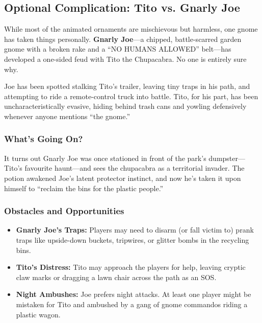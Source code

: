 \begin{multicols}{2}

\subsection{Optional Complication: Tito vs. Gnarly Joe}

While most of the animated ornaments are mischievous but harmless, one gnome has taken things personally. \textbf{Gnarly Joe}—a chipped, battle-scarred garden gnome with a broken rake and a “NO HUMANS ALLOWED” belt—has developed a one-sided feud with Tito the Chupacabra. No one is entirely sure why.

Joe has been spotted stalking Tito’s trailer, leaving tiny traps in his path, and attempting to ride a remote-control truck into battle. Tito, for his part, has been uncharacteristically evasive, hiding behind trash cans and yowling defensively whenever anyone mentions “the gnome.”

\subsubsection{What’s Going On?}
It turns out Gnarly Joe was once stationed in front of the park’s dumpster—Tito’s favourite haunt—and sees the chupacabra as a territorial invader. The potion awakened Joe’s latent protector instinct, and now he’s taken it upon himself to “reclaim the bins for the plastic people.”

\subsubsection{Obstacles and Opportunities}
\begin{itemize}
    \item \textbf{Gnarly Joe’s Traps:} Players may need to disarm (or fall victim to) prank traps like upside-down buckets, tripwires, or glitter bombs in the recycling bins.
    \item \textbf{Tito’s Distress:} Tito may approach the players for help, leaving cryptic claw marks or dragging a lawn chair across the path as an SOS.
    \item \textbf{Night Ambushes:} Joe prefers night attacks. At least one player might be mistaken for Tito and ambushed by a gang of gnome commandos riding a plastic wagon.
\end{itemize}


\end{multicols}
